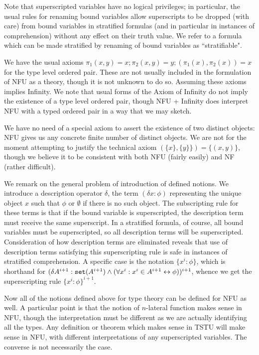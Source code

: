 \documentclass[12pt]{article}
\begin{document}
Note that superscripted variables have no logical privileges;  in particular, the usual rules for renaming bound variables allow superscripts to be dropped (with care) from bound variables
in stratified formulas (and in particular in instances of comprehension) without any effect on their truth value.  We refer to a formula which can be made stratified by renaming of bound variables
as ``stratifiable".

We have the usual axioms $\pi_1(x,y) = x; \pi_2(x,y)=y; (\pi_1(x),\pi_2(x))=x$ for the type level  ordered pair.  These are not usually included in the formulation of NFU as a theory, though it is not unknown to do so.
Assuming these axioms implies Infinity.  We note that usual forms of the Axiom of Infinity do not imply the existence of a type level ordered pair, though NFU + Infinity does interpret NFU with a typed ordered pair in a way that we may sketch.

We have no need of a special axiom to assert the existence of two distinct objects:  NFU gives us any concrete finite number of distinct objects.  We are not for the moment attempting to justify
the technical axiom $(\{x\},\{y\}\}) = \{(x,y)\}$, though we believe it to be consistent with both NFU (fairly easily) and NF (rather difficult).

We remark on the general problem of introduction of defined notions.  We introduce a description operator $\delta$, the term  $(\delta x:\phi)$ representing the unique object $x$ such that $\phi$ or $\emptyset$ if there is no such object.
The subscripting rule for these terms is that if the bound variable is superscripted, the description term must receive the same superscript.  In a stratified formula, of course, all bound variables must be superscripted,
so all description terms will be superscripted.  Consideration of how description terms are eliminated reveals that use of description terms satisfying this superscripting rule is safe in instances of stratified comprehension.
A specific case is the notation $\{x^i:\phi\}$, which is shorthand for $(\delta A^{i+1}:{\tt set}(A^{i+1}) \wedge (\forall x^i:x^i \in A^{i+1} \leftrightarrow \phi))^{i+1}$, whence we get the superscripting rule
$\{x^i:\phi\}^{i+1}$.

Now all of the notions defined above for type theory can be defined for NFU as well.  A particular point is that the notion of $n$-lateral function makes sense in NFU, though the interpretation must be different as we are actually identifying all the types.  Any definition or theorem which makes sense in TSTU will make sense in NFU, with different interpretations of any superscripted variables.  The converse is not necessarily the case.
\end{document}
